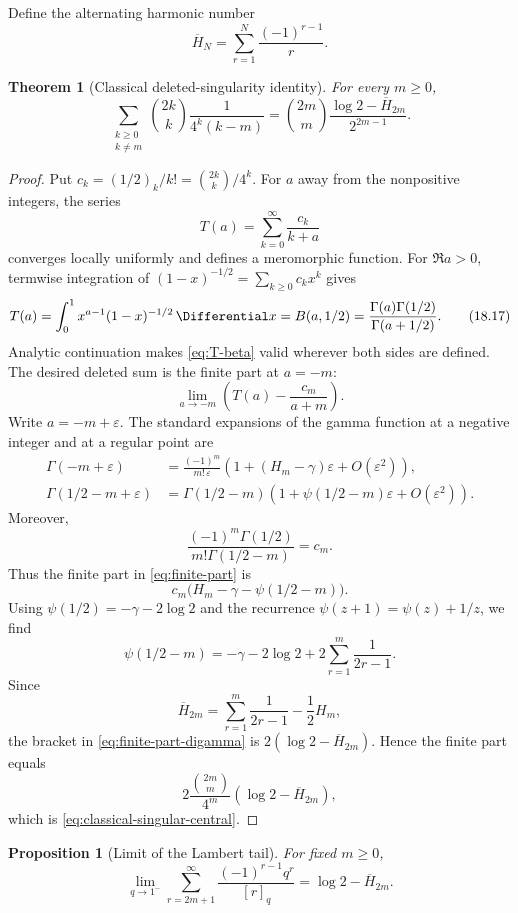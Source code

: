 \documentclass[11pt,a4paper,oneside,openany]{book}
\newtheorem{theorem}{Theorem}[chapter]
\newtheorem{proposition}[proposition]{Proposition}
\theoremstyle{definition}
\theoremstyle{remark}
\begin{document}
Define the alternating harmonic number
\[
 \overline H_N=\sum_{r=1}^{N}\frac{(-1)^{r-1}}r.
\]

\begin{theorem}[Classical deleted-singularity identity]\label{thm:classical-singular-central}
For every $m\ge0$,
\[
 \sum_{\substack{k\ge0\\k\ne m}}
 \binom{2k}{k}\frac1{4^k(k-m)}
 =\binom{2m}{m}
 \frac{\log2-\overline H_{2m}}{2^{2m-1}}.
 \tag{18.16}\label{eq:classical-singular-central}
\]
\end{theorem}

\begin{proof}
Put $c_k=(1/2)_k/k!=\binom{2k}{k}/4^k$.  For $a$ away from the nonpositive integers, the series
\[
 T(a)=\sum_{k=0}^{\infty}\frac{c_k}{k+a}
\]
converges locally uniformly and defines a meromorphic function.  For $\Re a>0$, termwise integration of
$(1-x)^{-1/2}=\sum_{k\ge0}c_kx^k$ gives
\[
 T(a)=\int_0^1x^{a-1}(1-x)^{-1/2}\,\Differential x
 =B(a,1/2)
 =\frac{\Gamma(a)\Gamma(1/2)}{\Gamma(a+1/2)}.
 \tag{18.17}\label{eq:T-beta}
\]
Analytic continuation makes \eqref{eq:T-beta} valid wherever both sides are defined.  The desired deleted sum is the finite part at $a=-m$:
\[
 \lim_{a\to-m}\left(T(a)-\frac{c_m}{a+m}\right).
 \tag{18.18}\label{eq:finite-part}
\]
Write $a=-m+\varepsilon$.  The standard expansions of the gamma function at a negative integer and at a regular point are
\begin{align*}
 \Gamma(-m+\varepsilon)
 &=\frac{(-1)^m}{m!\,\varepsilon}
   \left(1+(H_m-\gamma)\varepsilon+O(\varepsilon^2)\right),\\
 \Gamma(1/2-m+\varepsilon)
 &=\Gamma(1/2-m)
   \left(1+\psi(1/2-m)\varepsilon+O(\varepsilon^2)\right).
\end{align*}
Moreover,
\[
 \frac{(-1)^m\Gamma(1/2)}{m!\Gamma(1/2-m)}=c_m.
\]
Thus the finite part in \eqref{eq:finite-part} is
\[
 c_m\bigl(H_m-\gamma-\psi(1/2-m)\bigr).
 \tag{18.19}\label{eq:finite-part-digamma}
\]
Using $\psi(1/2)=-\gamma-2\log2$ and the recurrence
$\psi(z+1)=\psi(z)+1/z$, we find
\[
 \psi(1/2-m)
 =-\gamma-2\log2+2\sum_{r=1}^{m}\frac1{2r-1}.
\]
Since
\[
 \overline H_{2m}
 =\sum_{r=1}^{m}\frac1{2r-1}-\frac12H_m,
\]
the bracket in \eqref{eq:finite-part-digamma} is
$2(\log2-\overline H_{2m})$.  Hence the finite part equals
\[
 2\frac{\binom{2m}{m}}{4^m}
 (\log2-\overline H_{2m}),
\]
which is \eqref{eq:classical-singular-central}.
\end{proof}

\begin{proposition}[Limit of the Lambert tail]\label{prop:lambert-tail-limit}
For fixed $m\ge0$,
\[
 \lim_{q\to1^-}
 \sum_{r=2m+1}^{\infty}\frac{(-1)^{r-1}q^r}{[r]_q}
 =\log2-\overline H_{2m}.
 \tag{18.20}\label{eq:lambert-tail-limit}
\]
\end{proposition}
\end{document}
